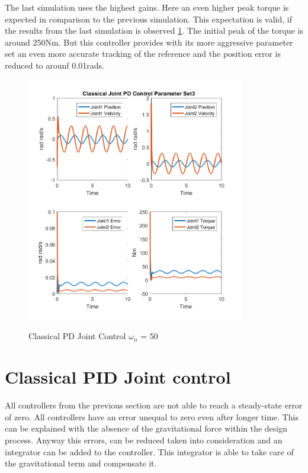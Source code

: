 The last simulation uses the highest gains. Here an even higher peak torque is expected in comparison to the previous simulation. This expectation is valid, if the results from the last simulation is observed \ref{fig:ch3_sim23}. The initial peak of the torque is around 250Nm. But this controller provides with its more aggressive parameter set an even more accurate tracking of the reference and the position error is reduced to arounf 0.01rads.
\begin{figure}[h]
	\centering
	\includegraphics[width=0.85\textwidth]{pics/ClassicalJointPDControlParameterSet3.png}\\
\caption{Classical PD Joint Control $\omega_n$ = 50}
	\label{fig:ch3_sim23}
\end{figure}


\section{Classical PID Joint control}

All controllers from the previous section are not able to reach a steady-state error of zero. All controllers have an error unequal to zero even after longer time. This can be explained with the absence of the gravitational force within the design process. Anyway this errors, can be reduced taken into consideration and an integrator can be added to the controller. This integrator is able to take care of the gravitational term and compensate it.\\

